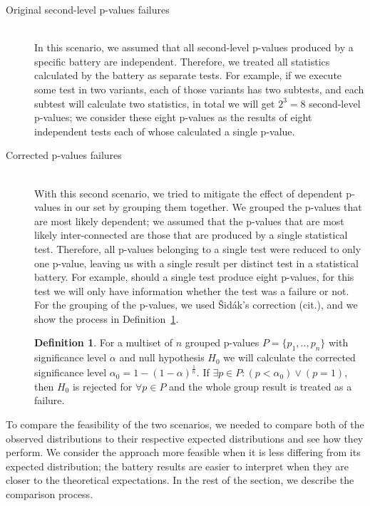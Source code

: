 \documentclass[
  digital,  	%
  color,		%
  oneside,   	%
  12pt,
  nocover,
  notable,
  nolof,
  nolot,
]{fithesis3}
\theoremstyle{definition}
\newtheorem{definition}{Definition}[section]
\theoremstyle{remark}
\begin{document}
\begin{description}
\item[Original second-level p-values failures] \hfill \\
In this scenario, we assumed that all second-level p-values produced by a specific battery are independent. Therefore, we treated all statistics calculated by the battery as separate tests. For example, if we execute some test in two variants, each of those variants has two subtests, and each subtest will calculate two statistics, in total we will get $2^3=8$ second-level p-values; we consider these eight p-values as the results of eight independent tests each of whose calculated a single p-value. 

\item[Corrected p-values failures] \hfill \\
With this second scenario, we tried to mitigate the effect of dependent p-values in our set by grouping them together. We grouped the p-values that are most likely dependent; we assumed that the p-values that are most likely inter-connected are those that are produced by a single statistical test. Therefore, all p-values belonging to a single test were reduced to only one p-value, leaving us with a single result per distinct test in a statistical battery. For example, should a single test produce eight p-values, for this test we will only have information whether the test was a failure or not. For the grouping of the p-values, we used Šidák's correction (cit.), and we show the process in Definition~\ref{def:sidak}.

\begin{definition}
\label{def:sidak}
For a multiset of $n$ grouped p-values $P = \{p_1,..,p_n\}$ with significance level $\alpha$ and null hypothesis $H_0$ we will calculate the corrected significance level $\alpha_0 = 1 - (1 - \alpha)^{\frac{1}{n}}$. If $\exists p \in P : (p < \alpha_0) \vee (p = 1) $, then $H_0$ is rejected for $\forall p \in P$ and the whole group result is treated as a failure.
\end{definition}

\end{description}

To compare the feasibility of the two scenarios, we needed to compare both of the observed distributions to their respective expected distributions and see how they perform. We consider the approach more feasible when it is less differing from its expected distribution; the battery results are easier to interpret when they are closer to the theoretical expectations. In the rest of the section, we describe the comparison process.
\end{document}
